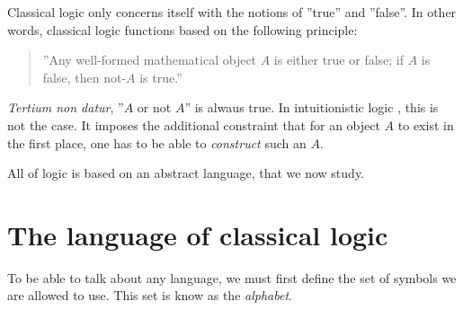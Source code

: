 \documentclass[11pt,a4paper]{article}
\begin{document}
Classical logic \LK{} only concerns itself with the notions of ''true'' and ''false''.
In other words, classical logic functions based on the following principle:
\begin{quote}
    ''Any well-formed mathematical object \(A\) is either true or false;
    if \(A\) is false, then not-\(A\) is true.''
\end{quote}
\emph{Tertium non datur}, ''\(A\) or not \(A\)'' is alwaus true.
In intuitionistic logic \LJ, this is not the case.
It imposes the additional constraint that for an object \(A\)
to exist in the first place, one has to be able to \emph{construct}
such an \(A\).

All of logic is based on an abstract language, that we now study.

\section{The language of classical logic \LK}

To be able to talk about any language, we must first define the set of symbols we are allowed to use.
This set is know as the \emph{alphabet}.
\end{document}
